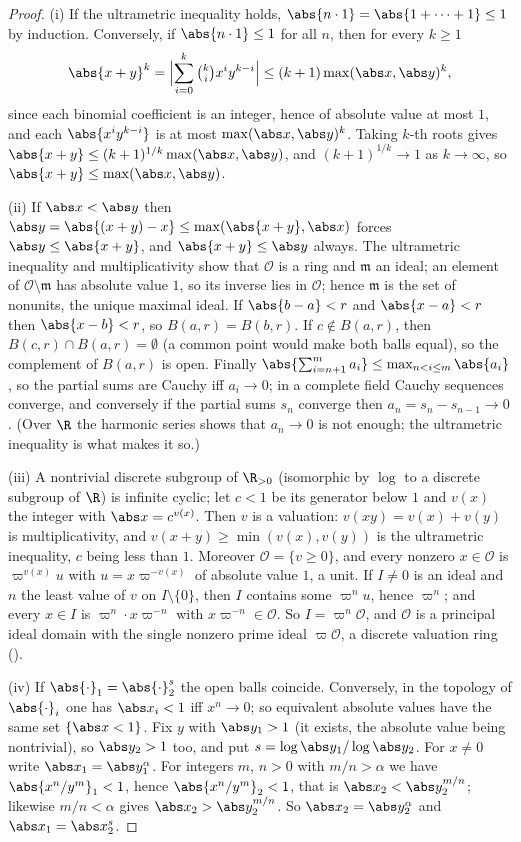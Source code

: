 \begin{proof}
(i) If the ultrametric inequality holds, $\abs{n\cdot1}=\abs{1+\dots+1}\le1$ by induction. Conversely, if $\abs{n\cdot1}\le1$ for all $n$, then
for every $k\ge1$
\[
\abs{x+y}^k=\Bigl\lvert\sum_{i=0}^k\tbinom ki x^iy^{k-i}\Bigr\rvert\le(k+1)\max(\abs x,\abs y)^k,
\]
since each binomial coefficient is an integer, hence of absolute value at most $1$, and each $\abs{x^iy^{k-i}}$ is at most $\max(\abs x,\abs y)^k$.
Taking $k$-th roots gives $\abs{x+y}\le(k+1)^{1/k}\max(\abs x,\abs y)$, and $(k+1)^{1/k}\to1$ as $k\to\infty$, so $\abs{x+y}\le\max(\abs x,\abs y)$.

(ii) If $\abs x<\abs y$ then $\abs y=\abs{(x+y)-x}\le\max(\abs{x+y},\abs x)$ forces $\abs y\le\abs{x+y}$, and $\abs{x+y}\le\abs y$ always. The
ultrametric inequality and multiplicativity show that $\mathcal O$ is a ring and $\mathfrak m$ an ideal; an element of $\mathcal O\setminus\mathfrak m$ has
absolute value $1$, so its inverse lies in $\mathcal O$; hence $\mathfrak m$ is the set of nonunits, the unique maximal ideal. If
$\abs{b-a}<r$ and $\abs{x-a}<r$ then $\abs{x-b}<r$, so $B(a,r)=B(b,r)$. If $c\notin B(a,r)$, then $B(c,r)\cap B(a,r)=\emptyset$ (a common point
would make both balls equal), so the complement of $B(a,r)$ is open. Finally $\abs{\sum_{i=n+1}^ma_i}\le\max_{n<i\le m}\abs{a_i}$, so the partial
sums are Cauchy iff $a_i\to0$; in a complete field Cauchy sequences converge, and conversely if the partial sums $s_n$ converge then
$a_n=s_n-s_{n-1}\to0$. (Over $\R$ the harmonic series shows that $a_n\to0$ is not enough; the ultrametric inequality is what makes it so.)

(iii) A nontrivial discrete subgroup of $\R_{>0}$ (isomorphic by $\log$ to a discrete subgroup of $\R$) is infinite cyclic; let $c<1$ be
its generator below $1$ and $v(x)$ the integer with $\abs x=c^{v(x)}$. Then $v$ is a valuation: $v(xy)=v(x)+v(y)$ is multiplicativity, and
$v(x+y)\ge\min(v(x),v(y))$ is the ultrametric inequality, $c$ being less than $1$. Moreover $\mathcal O=\{v\ge0\}$, and every nonzero
$x\in\mathcal O$ is $\varpi^{v(x)}u$ with $u=x\varpi^{-v(x)}$ of absolute value $1$, a unit. If $I\ne0$ is an ideal and $n$ the least value of
$v$ on $I\setminus\{0\}$, then $I$ contains some $\varpi^nu$, hence $\varpi^n$; and every $x\in I$ is $\varpi^n\cdot x\varpi^{-n}$ with
$x\varpi^{-n}\in\mathcal O$. So $I=\varpi^n\mathcal O$, and $\mathcal O$ is a principal ideal domain with the single nonzero prime ideal
$\varpi\mathcal O$, a discrete valuation ring ().

(iv) If $\abs{\cdot}_1=\abs{\cdot}_2^s$ the open balls coincide. Conversely, in the topology of $\abs{\cdot}_i$ one has $\abs x_i<1$ iff
$x^n\to0$; so equivalent absolute values have the same set $\{\abs x<1\}$. Fix $y$ with $\abs y_1>1$ (it exists, the absolute value being
nontrivial), so $\abs y_2>1$ too, and put $s=\log\abs y_1/\log\abs y_2$. For $x\ne0$ write $\abs x_1=\abs y_1^{\alpha}$. For integers $m$, $n>0$
with $m/n>\alpha$ we have $\abs{x^n/y^m}_1<1$, hence $\abs{x^n/y^m}_2<1$, that is $\abs x_2<\abs y_2^{m/n}$; likewise $m/n<\alpha$ gives
$\abs x_2>\abs y_2^{m/n}$. So $\abs x_2=\abs y_2^{\alpha}$ and $\abs x_1=\abs x_2^{s}$.
\end{proof}

